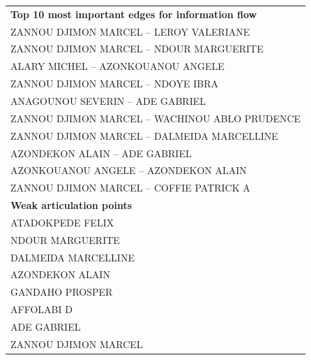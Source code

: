 \begin{table}[h!]
\begin{tabular}{l}
\hline
\textbf{Top 10 most important edges for information flow}\\
\hspace{20pt}ZANNOU DJIMON MARCEL -- LEROY VALERIANE\\
\hspace{20pt}ZANNOU DJIMON MARCEL -- NDOUR MARGUERITE\\
\hspace{20pt}ALARY MICHEL -- AZONKOUANOU ANGELE\\
\hspace{20pt}ZANNOU DJIMON MARCEL -- NDOYE IBRA\\
\hspace{20pt}ANAGOUNOU SEVERIN -- ADE GABRIEL\\
\hspace{20pt}ZANNOU DJIMON MARCEL -- WACHINOU ABLO PRUDENCE\\
\hspace{20pt}ZANNOU DJIMON MARCEL -- DALMEIDA MARCELLINE\\
\hspace{20pt}AZONDEKON ALAIN -- ADE GABRIEL\\
\hspace{20pt}AZONKOUANOU ANGELE -- AZONDEKON ALAIN\\      
\hspace{20pt}ZANNOU DJIMON MARCEL -- COFFIE PATRICK A\\
\hline
\textbf{Weak articulation points}\\
\hspace{20pt}ATADOKPEDE FELIX\\
\hspace{20pt}NDOUR MARGUERITE\\
\hspace{20pt}DALMEIDA MARCELLINE\\
\hspace{20pt}AZONDEKON ALAIN\\
\hspace{20pt}GANDAHO PROSPER\\
\hspace{20pt}AFFOLABI D\\
\hspace{20pt}ADE GABRIEL\\
\hspace{20pt}ZANNOU DJIMON MARCEL\\
\bottomrule
\end{tabular}
\end{table}

